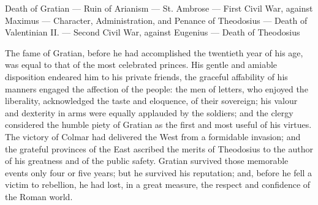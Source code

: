 

Death of Gratian \texthebrew{—} Ruin of Arianism \texthebrew{—} St. Ambrose \texthebrew{—} First Civil War, against Maximus \texthebrew{—} Character, Administration, and Penance of Theodosius \texthebrew{—} Death of Valentinian II. \texthebrew{—} Second Civil War, against Eugenius \texthebrew{—} Death of Theodosius

The fame of Gratian, before he had accomplished the twentieth year of his age, was equal to that of the most celebrated princes. His gentle and amiable disposition endeared him to his private friends, the graceful affability of his manners engaged the affection of the people: the men of letters, who enjoyed the liberality, acknowledged the taste and eloquence, of their sovereign; his valour and dexterity in arms were equally applauded by the soldiers; and the clergy considered the humble piety of Gratian as the first and most useful of his virtues. The victory of Colmar had delivered the West from a formidable invasion; and the grateful provinces of the East ascribed the merits of Theodosius to the author of his greatness and of the public safety. Gratian survived those memorable events only four or five years; but he survived his reputation; and, before he fell a victim to rebellion, he had lost, in a great measure, the respect and confidence of the Roman world.

